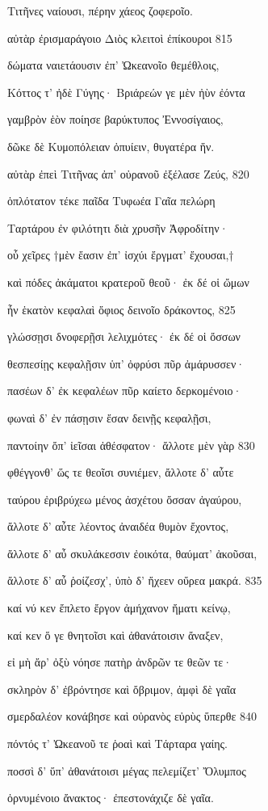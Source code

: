 Τιτῆνες ναίουσι, πέρην χάεος ζοφεροῖο. 

αὐτὰρ ἐρισμαράγοιο Διὸς κλειτοὶ ἐπίκουροι \num{815}

δώματα ναιετάουσιν ἐπ' Ὠκεανοῖο θεμέθλοις,

Κόττος τ' ἠδὲ Γύγης· Βριάρεών γε μὲν ἠὺν ἐόντα 

γαμβρὸν ἑὸν ποίησε βαρύκτυπος Ἐννοσίγαιος,

δῶκε δὲ Κυμοπόλειαν ὀπυίειν, θυγατέρα ἥν.

αὐτὰρ ἐπεὶ Τιτῆνας ἀπ' οὐρανοῦ ἐξέλασε Ζεύς, \num{820} 

ὁπλότατον τέκε παῖδα Τυφωέα Γαῖα πελώρη

Ταρτάρου ἐν φιλότητι διὰ χρυσῆν Ἀφροδίτην· 

οὗ χεῖρες †μὲν ἔασιν ἐπ' ἰσχύι ἔργματ' ἔχουσαι,†

καὶ πόδες ἀκάματοι κρατεροῦ θεοῦ· ἐκ δέ οἱ ὤμων 

ἦν ἑκατὸν κεφαλαὶ ὄφιος δεινοῖο δράκοντος, \num{825} 

γλώσσῃσι δνοφερῇσι λελιχμότες· ἐκ δέ οἱ ὄσσων 

θεσπεσίῃς κεφαλῇσιν ὑπ' ὀφρύσι πῦρ ἀμάρυσσεν· 

πασέων δ' ἐκ κεφαλέων πῦρ καίετο δερκομένοιο· 

φωναὶ δ' ἐν πάσῃσιν ἔσαν δεινῇς κεφαλῇσι,

παντοίην ὄπ' ἰεῖσαι ἀθέσφατον· ἄλλοτε μὲν γὰρ \num{830} 

φθέγγονθ' ὥς τε θεοῖσι συνιέμεν, ἄλλοτε δ' αὖτε

ταύρου ἐριβρύχεω μένος ἀσχέτου ὄσσαν ἀγαύρου, 

ἄλλοτε δ' αὖτε λέοντος ἀναιδέα θυμὸν ἔχοντος,

ἄλλοτε δ' αὖ σκυλάκεσσιν ἐοικότα, θαύματ' ἀκοῦσαι,

ἄλλοτε δ' αὖ ῥοίζεσχ', ὑπὸ δ' ἤχεεν οὔρεα μακρά. \num{835}

καί νύ κεν ἔπλετο ἔργον ἀμήχανον ἤματι κείνῳ,

καί κεν ὅ γε θνητοῖσι καὶ ἀθανάτοισιν ἄναξεν,

εἰ μὴ ἄρ' ὀξὺ νόησε πατὴρ ἀνδρῶν τε θεῶν τε· 

σκληρὸν δ' ἐβρόντησε καὶ ὄβριμον, ἀμφὶ δὲ γαῖα

σμερδαλέον κονάβησε καὶ οὐρανὸς εὐρὺς ὕπερθε \num{840}

πόντός τ' Ὠκεανοῦ τε ῥοαὶ καὶ Τάρταρα γαίης. 

ποσσὶ δ' ὕπ' ἀθανάτοισι μέγας πελεμίζετ' Ὄλυμπος

ὀρνυμένοιο ἄνακτος· ἐπεστονάχιζε δὲ γαῖα.

